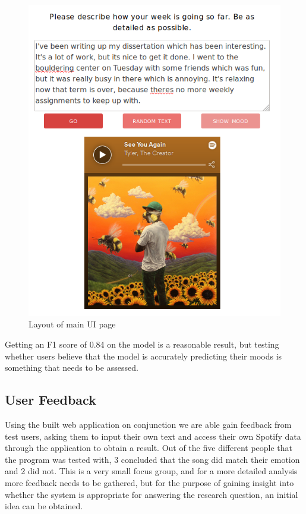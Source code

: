 \begin{figure}[ht]
\centering
\includegraphics[scale=0.4]{implementation/tamara.png}
\caption{Layout of main UI page}
\label{UIlayout}
\end{figure}

Getting an F1 score of 0.84 on the model is a reasonable result, but testing whether users believe that the model is accurately predicting their moods is something that needs to be assessed. 

\subsection{User Feedback}
Using the built web application on conjunction we are able gain feedback from test users, asking them to input their own text and access their own Spotify data through the application to obtain a result. 
Out of the five different people that the program was tested with, 3 concluded that the song did match their emotion and 2 did not. This is a very small focus group, and for a more detailed analysis more feedback needs to be gathered, but for the purpose of gaining insight into whether the system is appropriate for answering the research question, an initial idea can be obtained.

